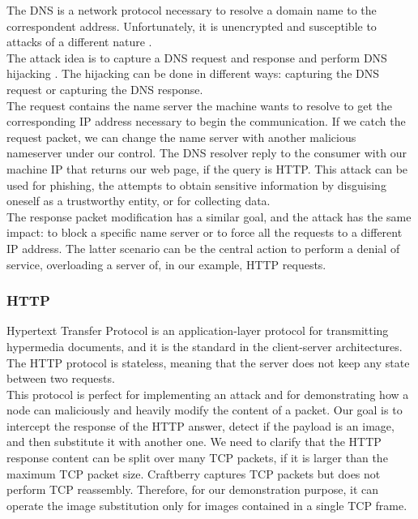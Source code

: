 \documentclass[12pt]{article}
\begin{document}
	The DNS is a network protocol necessary to resolve a domain name to the correspondent address. Unfortunately, it is unencrypted and susceptible to attacks of a different nature \cite{DNSATTACKS}.\\
	The attack idea is to capture a DNS request and response and perform DNS hijacking \cite{DNShijacking}. The hijacking can be done in different ways: capturing the DNS request or capturing the DNS response.\\
	\bigbreak	
	The request contains the name server the machine wants to resolve to get the corresponding IP address necessary to begin the communication. If we catch the request packet, we can change the name server with another malicious nameserver under our control. The DNS resolver reply to the consumer with our machine IP that returns our web page, if the query is HTTP. This attack can be used for phishing, the attempts to obtain sensitive information by disguising oneself as a trustworthy entity, or for collecting data.\\
	The response packet modification has a similar goal, and the attack has the same impact: to block a specific name server or to force all the requests to a different IP address. The latter scenario can be the central action to perform a denial of service, overloading a server of, in our example, HTTP requests.
	
	\subsubsection{HTTP}

	Hypertext Transfer Protocol is an application-layer protocol for transmitting hypermedia documents, and it is the standard in the client-server architectures. The HTTP protocol is stateless, meaning that the server does not keep any state between two requests.\\
	This protocol is perfect for implementing an attack and for demonstrating how a node can maliciously and heavily modify the content of a packet. Our goal is to intercept the response of the HTTP answer, detect if the payload is an image, and then substitute it with another one. We need to clarify that the HTTP response content can be split over many TCP packets, if it is larger than the maximum TCP packet size. Craftberry captures TCP packets but does not perform TCP reassembly. Therefore, for our demonstration purpose, it can operate the image substitution only for images contained in a single TCP frame.\\
	
\end{document}
